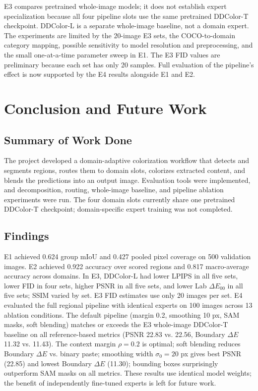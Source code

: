 \documentclass{FastFyp}
\begin{document}
E3 compares pretrained whole-image models; it does not establish expert
specialization because all four pipeline slots use the same pretrained
DDColor-T checkpoint. DDColor-L is a separate whole-image baseline, not a
domain expert. The experiments are limited by the 20-image E3 sets, the
COCO-to-domain category mapping, possible sensitivity to model resolution and
preprocessing, and the small one-at-a-time parameter sweep in E1. The E3 FID
values are preliminary because each set has only 20 samples. Full evaluation
of the pipeline's effect is now supported by the E4 results alongside E1
and E2.

\chapter{Conclusion and Future Work}
\label{ch:conclusion}

\section{Summary of Work Done}
\label{sec:summary-work}
The project developed a domain-adaptive colorization workflow that detects
and segments regions, routes them to domain slots, colorizes extracted
content, and blends the predictions into an output image. Evaluation tools
were implemented, and decomposition, routing, whole-image baseline, and
pipeline ablation experiments were run. The four domain slots currently share
one pretrained DDColor-T checkpoint; domain-specific expert training was not
completed.

\section{Findings}
\label{sec:findings}
E1 achieved 0.624 group mIoU and 0.427 pooled pixel coverage on 500 validation
images. E2 achieved 0.922 accuracy over scored regions and 0.817 macro-average
accuracy across domains. In E3, DDColor-L had lower LPIPS in all five sets,
lower FID in four sets, higher PSNR in all five sets, and lower Lab
$\Delta E_{00}$ in all five sets; SSIM varied by set. E3 FID estimates use
only 20 images per set. E4 evaluated the full regional pipeline with identical
experts on 100 images across 13 ablation conditions. The default pipeline
(margin 0.2, smoothing 10 px, SAM masks, soft blending) matches or exceeds
the E3 whole-image DDColor-T baseline on all reference-based metrics (PSNR
22.83 vs. 22.56, Boundary $\Delta E$ 11.32 vs. 11.43). The context margin
$\rho=0.2$ is optimal; soft blending reduces Boundary $\Delta E$ vs. binary
paste; smoothing width $\sigma_0=20$ px gives best PSNR (22.85) and lowest
Boundary $\Delta E$ (11.30); bounding boxes surprisingly outperform SAM masks
on all metrics. These results use identical model weights; the benefit of
independently fine-tuned experts is left for future work.
\end{document}
